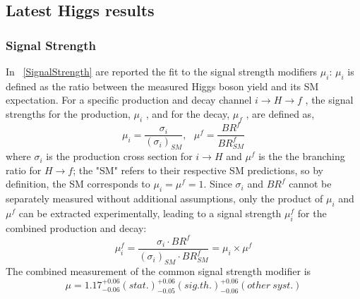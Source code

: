 \subsection{Latest Higgs results}
\subsubsection{Signal Strength}
In \figurename~\ref{SignalStrength} are reported the fit to the signal strength modifiers $\mu_i$: $\mu_i$ is defined as the ratio between the measured Higgs boson yield and its SM expectation. For a specific production and decay channel $i \to H \to f$ , the signal strengths for the production, $\mu_i$ , and for the decay, $\mu_f$ , are defined as,
\[
\mu_i = \frac{\sigma_i}{(\sigma_i)_{SM}},\ \ \ \mu^f = \frac{BR^f}{{BR}^f_{SM}}
\]
where $\sigma_i$ is the production cross section for $i \to H$ and $\mu^f$ is the the branching ratio for  $H \to f$; the "SM" refers to their respective SM predictions, so by definition, the SM corresponds to $\mu_i = \mu^f = 1$. Since $\sigma_i$ and $BR^f$ cannot be separately measured without additional assumptions, only the product of $\mu_i$ and $\mu^f $ can be extracted experimentally, leading to a signal strength $\mu^f_i$ for the combined production and decay:
\[
\mu^f_i = \frac{\sigma_i \cdot BR^f}{(\sigma_i)_{SM}\cdot {BR}^f_{SM}} = \mu_i \times \mu^f
\]
The combined measurement of the common signal strength modifier is \cite{LatestHiggsCMS}
\[
\mu = 1.17^{+0.06}_{-0.06}(stat.)^{+0.06}_{-0.05}(sig.th.)^{+0.06}_{-0.06}(other\ syst.) 
\]
